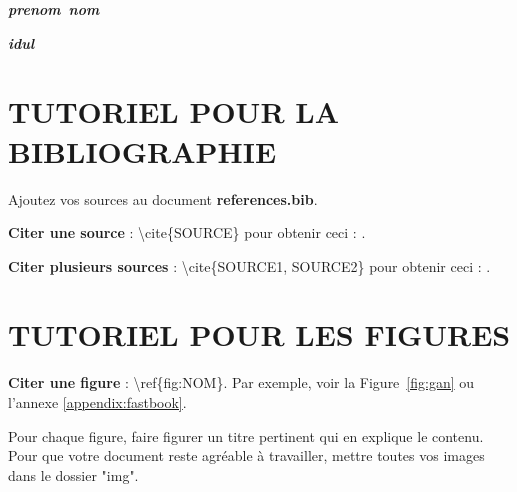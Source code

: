 \documentclass[12pt]{article}
\newcommand{\prenomStagiaire}{\textit{prenom}}
\newcommand{\nomStagiaire}{\textit{nom}}
\newcommand{\idul}{\textit{idul}}
\begin{document}
	\begin{minipage}[t]{6cm}
		\begin{flushleft}
			\textbf{\prenomStagiaire~\nomStagiaire}\\
		\end{flushleft}
	\end{minipage}
	\begin{minipage}[t]{10cm}
		\begin{flushright}
			\hspace*{1cm}\textbf{\idul} \\
		\end{flushright}
	\end{minipage}

	\newpage

	\newpage
	\tableofcontents

	\newpage
	\listoftables

	\newpage
	\listoffigures

	\newpage
	
	\break

	\newpage

	

	\section{TUTORIEL POUR LA BIBLIOGRAPHIE}
	Ajoutez vos sources au document \textbf{references.bib}.

	\textbf{Citer une source} : \textbackslash cite\{SOURCE\} pour obtenir ceci :
	\cite{howard2020deep}.

	\textbf{Citer plusieurs sources} : \textbackslash cite\{SOURCE1, SOURCE2\} pour obtenir
	ceci : \cite{goodfellow2014generative, CycleGAN2017}.
	\section{TUTORIEL POUR LES FIGURES}

	\textbf{Citer une figure} : \textbackslash ref\{fig:NOM\}. Par exemple, voir la Figure~\ref{fig:gan}
	ou l'annexe \ref{appendix:fastbook}.

	Pour chaque figure, faire figurer un titre pertinent qui en explique le contenu. Pour que
	votre document reste agréable à travailler, mettre toutes vos images dans le dossier "img".
\end{document}
